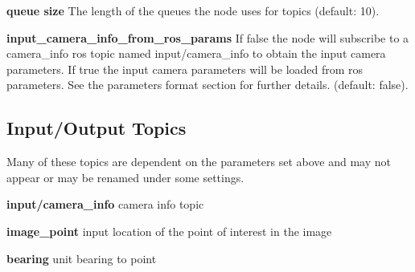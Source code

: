 \begin{DoxyItemize}
\item {\bfseries queue size} The length of the queues the node uses for topics (default\+: 10).
\item {\bfseries input\+\_\+camera\+\_\+info\+\_\+from\+\_\+ros\+\_\+params} If false the node will subscribe to a camera\+\_\+info ros topic named input/camera\+\_\+info to obtain the input camera parameters. If true the input camera parameters will be loaded from ros parameters. See the parameters format section for further details. (default\+: false).
\end{DoxyItemize}\hypertarget{md_vision_layer_image_undistort_README_autotoc_md114}{}\subsection{Input/\+Output Topics}\label{md_vision_layer_image_undistort_README_autotoc_md114}
Many of these topics are dependent on the parameters set above and may not appear or may be renamed under some settings.
\begin{DoxyItemize}
\item {\bfseries input/camera\+\_\+info} camera info topic
\item {\bfseries image\+\_\+point} input location of the point of interest in the image
\item {\bfseries bearing} unit bearing to point 
\end{DoxyItemize}
